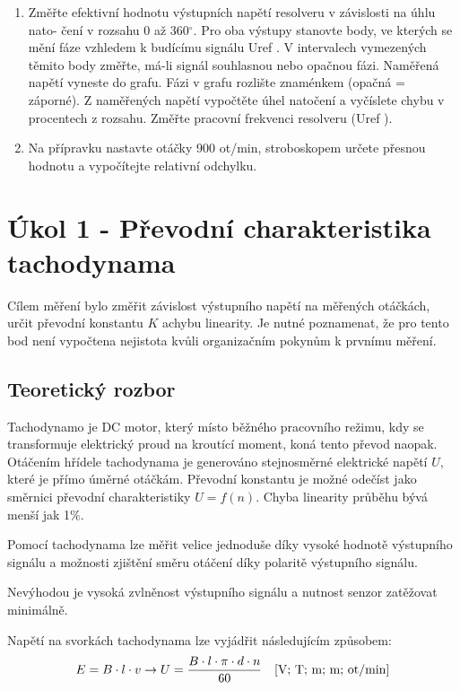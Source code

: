 \documentclass{protokol}
\begin{document}
\begin{enumerate}
        \item   Změřte efektivní hodnotu výstupních napětí resolveru v závislosti na úhlu nato-
                čení v rozsahu 0 až 360$^\circ$. Pro oba výstupy stanovte body, ve kterých se mění fáze
                vzhledem k budícímu signálu Uref . V intervalech vymezených těmito body změřte,
                má-li signál souhlasnou nebo opačnou fázi. Naměřená napětí vyneste do grafu. Fázi
                v grafu rozlište znaménkem (opačná = záporné). Z naměřených napětí vypočtěte
                úhel natočení a vyčíslete chybu v procentech z rozsahu. Změřte pracovní frekvenci
                resolveru (Uref ).

        \item   Na přípravku nastavte otáčky 900 ot/min, stroboskopem určete přesnou hodnotu a
                vypočítejte relativní odchylku.
    \end{enumerate}

\section{Úkol 1 - Převodní charakteristika tachodynama}
    Cílem měření bylo změřit závislost výstupního napětí na měřených otáčkách, určit převodní konstantu $K$ achybu linearity. Je nutné poznamenat, 
    že pro tento bod není vypočtena nejistota kvůli organizačním pokynům k prvnímu měření. 
    \subsection{Teoretický rozbor}
    Tachodynamo je DC motor, který místo běžného pracovního režimu, kdy se transformuje elektrický proud na kroutící moment, koná tento převod naopak.
    Otáčením hřídele tachodynama je generováno stejnosměrné elektrické napětí $U$, které je přímo úměrné otáčkám. Převodní konstantu je možné
    odečíst jako směrnici převodní charakteristiky $U = f(n)$. Chyba linearity průběhu bývá menší jak 1$\%$\cite{navod}.

    Pomocí tachodynama lze měřit velice jednoduše díky vysoké hodnotě výstupního signálu a možnosti zjištění směru otáčení díky polaritě výstupního signálu. 
    
    Nevýhodou je vysoká zvlněnost výstupního signálu a nutnost senzor zatěžovat minimálně. 

    Napětí na svorkách tachodynama lze vyjádřit následujícím způsobem:
    \begin{equation}
        E = B \cdot l \cdot v \rightarrow U = \dfrac{B \cdot l \cdot \pi \cdot d \cdot n}{60} \text{\quad [V; T; m; m; ot/min]}
    \end{equation}  
    
\end{document}
